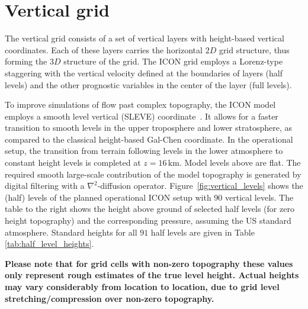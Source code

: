 \section{Vertical grid}

The vertical grid consists of a set of vertical layers with height-based vertical coordinates.
Each of these layers carries the horizontal $2D$ grid structure, thus forming the $3D$ structure of the grid.
The ICON grid employs a Lorenz-type staggering with the vertical velocity defined at the boundaries of layers (half levels) 
and the other prognostic variables in the center of the layer (full levels).

To improve simulations of flow past complex topography, the ICON model employs a smooth level vertical (SLEVE) coordinate~\citep{Leuenberger2010}. 
It allows for a faster transition to smooth levels in the upper troposphere and lower stratosphere, as compared to the classical height-based Gal-Chen 
coordinate. In the operational setup, the transition from terrain following levels in the lower atmosphere to constant height levels is completed 
at $z=16\,\mathrm{km}$. Model levels above are flat. The required smooth large-scale contribution of the model topography is generated by 
digital filtering with a $\nabla^2$-diffusion operator. Figure~\ref{fig:vertical_levels} shows the (half) levels of the planned operational 
ICON setup with 90 vertical levels. The table to the right shows the height above ground of selected half levels (for zero height topography) 
and the corresponding pressure, assuming the US standard atmosphere. Standard heights for all $91$ half levels are given in Table 
\ref{tab:half_level_heights}.

\textbf{Please note that for grid cells with non-zero topography these values only represent rough estimates of the true level height. Actual heights may 
vary considerably from location to location, due to grid level stretching/compression over non-zero topography.}
  



